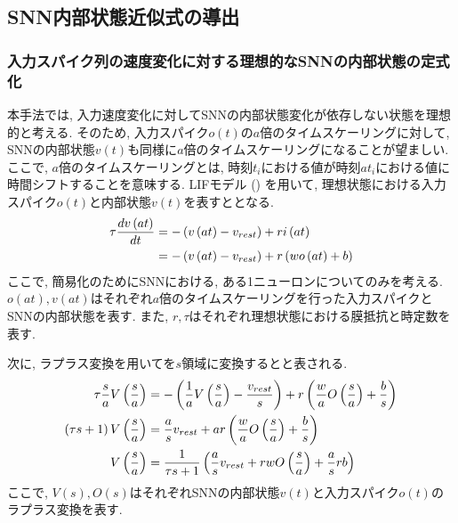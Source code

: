 \subsection{SNN内部状態近似式の導出} \label{method:proposed}

\subsubsection{入力スパイク列の速度変化に対する理想的なSNNの内部状態の定式化}
本手法では, 入力速度変化に対してSNNの内部状態変化が依存しない状態を理想的と考える.
そのため, 入力スパイク$o(t)$の$a$倍のタイムスケーリングに対して, SNNの内部状態$v(t)$も同様に$a$倍のタイムスケーリングになることが望ましい.
ここで, $a$倍のタイムスケーリングとは, 時刻$t_i$における値が時刻$at_i$における値に時間シフトすることを意味する.
LIFモデル () を用いて, 理想状態における入力スパイク$o(t)$と内部状態$v(t)$を表すととなる.
\begin{align}
    \tau \frac{dv\left(at\right)}{dt} &= -\left(v\left(at\right) - v_{rest}\right) + r i\left(at\right) \notag \\
     &= -\left(v\left(at\right) - v_{rest}\right) + r \left( wo\left(at\right) + b \right) \label{eq:ideal:state}
\end{align}
ここで, 簡易化のためにSNNにおける, ある1ニューロンについてのみを考える.
$o(at), v(at)$はそれぞれ$a$倍のタイムスケーリングを行った入力スパイクとSNNの内部状態を表す.
また, $r, \tau$はそれぞれ理想状態における膜抵抗と時定数を表す.

次に, ラプラス変換を用いてを$s$領域に変換するとと表される.
\begin{align}
    \tau \frac{s}{a} V\left(\frac{s}{a}\right) &= -\left(\frac{1}{a} V\left(\frac{s}{a}\right) 
    - \frac{v_{rest}}{s}\right) + r \left( \frac{w}{a} O\left(\frac{s}{a}\right) + \frac{b}{s} \right) \notag \\
    \left(\tau s +1\right) V\left(\frac{s}{a}\right)  &= \frac{a}{s} v_{rest} +ar \left( \frac{w}{a} O\left(\frac{s}{a}\right) + \frac{b}{s} \right) \notag \\
    V\left(\frac{s}{a}\right) &=  \frac{1}{\tau s +1}\left( \frac{a}{s} v_{rest} +rw O\left(\frac{s}{a}\right) + \frac{a}{s}rb \right) \label{eq:ideal:state:laplace}
\end{align}
ここで, $V(s), O(s)$はそれぞれSNNの内部状態$v(t)$と入力スパイク$o(t)$のラプラス変換を表す.


